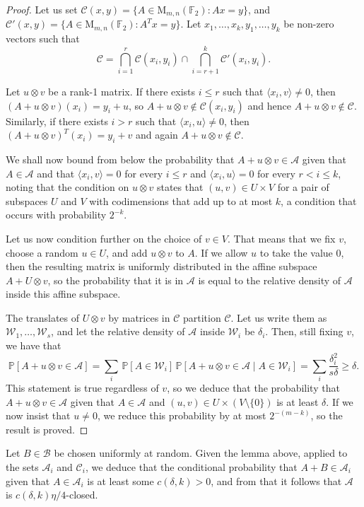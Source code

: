 \documentclass{toc}
\renewcommand\P{\mathbb{P}}
\newcommand\F{\mathbb{F}}
\renewcommand\d{\delta}
\newcommand \cA{\mathcal A}
\newcommand \cB{\mathcal B}
\newcommand \cC{\mathcal C}
\newcommand \cW{\mathcal W}
\newcommand \mn{\mathrm{M}_{m,n}(\F_2)}
\begin{document}
\begin{proof}
  Let us set $\cC(x,y)=\{A\in\mn:Ax=y\}$, and $\cC'(x,y)=\{A\in\mn:A^Tx=y\}$. Let $x_1,\dots,x_k,y_1,\dots,y_k$ be non-zero vectors such that
  \[
    \cC=\bigcap_{i=1}^r\cC(x_i,y_i)\cap\bigcap_{i=r+1}^k\cC'(x_i,y_i).
  \]

  Let $u\otimes v$ be a rank-1 matrix. If there exists $i\leq r$ such that $\langle x_i,v\rangle\ne 0$, then $(A+u\otimes v)(x_i)=y_i+u$, so $A+u\otimes v\notin\cC(x_i,y_i)$ and hence $A+u\otimes v\notin\cC$. Similarly, if there exists $i>r$ such that $\langle x_i,u\rangle\ne 0$, then $(A+u\otimes v)^T(x_i)=y_i+v$ and again $A+u\otimes v\notin\cC$. 
	
	We shall now bound from below the probability that $A+u\otimes v\in\cA$ given that $A\in\cA$ and that $\langle x_i,v\rangle=0$ for every $i\leq r$ and $\langle x_i,u\rangle=0$ for every $r<i\leq k$, noting that the condition on $u\otimes v$ states that $(u,v)\in U\times V$ for a pair of subspaces $U$ and $V$ with codimensions that add up to at most $k$, a condition that occurs with probability $2^{-k}$.
	
	Let us now condition further on the choice of $v\in V$. That means that we fix $v$, choose a random $u\in U$, and add $u\otimes v$ to $A$. If we allow $u$ to take the value 0, then the resulting matrix is uniformly distributed in the affine subspace $A+U\otimes v$, so the probability that it is in $\cA$ is equal to the relative density of $\cA$ inside this affine subspace.
	
	The translates of $U\otimes v$ by matrices in $\cC$ partition $\cC$. Let us write them as $\cW_1,\dots,\cW_s$, and let the relative density of $\cA$ inside $\cW_i$ be $\d_i$. Then, still fixing $v$, we have that
	\[\P[A+u\otimes v\in\cA]=\sum_i\,\P[A\in\cW_i]\,\P[A+u\otimes v\in\cA \mid A\in\cW_i]=\sum_i \frac{\d_i^2}{s\delta}\geq\d.\]
	This statement is true regardless of $v$, so we deduce that the probability that $A+u\otimes v\in\cA$ given that $A\in\cA$ and $(u,v)\in U\times(V\setminus\{0\})$ is at least $\d$. If we now insist that $u\ne 0$, we reduce this probability by at most $2^{-(m-k)}$, so the result is proved.
\end{proof}

Let $B\in\cB$ be chosen uniformly at random. Given the lemma above, applied to the sets $\cA_i$ and $\cC_i$, we deduce that the conditional probability that $A+B\in\cA_i$ given that $A\in\cA_i$ is at least some $c(\d,k)>0$, and from that it follows that $\cA$ is  $c(\d,k)\eta/4$-closed.
\end{document}
